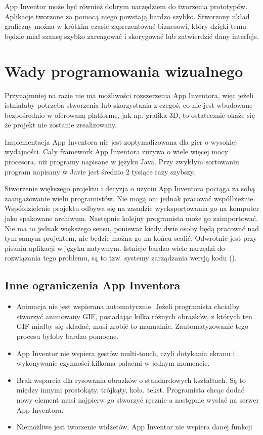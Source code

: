 App Inventor może być również dobrym narzędziem do tworzenia prototypów. Aplikacje tworzone za pomocą niego powstają bardzo szybko. Stworzony układ graficzny można w krótkim czasie zaprezentować biznesowi, który dzięki temu będzie miał szansę szybko zareagować i skorygować lub zatwierdzić dany interfejs.

\section{Wady programowania wizualnego}

Przynajmniej na razie nie ma możliwości rozszerzenia App Inventora, więc jeżeli istniałaby potrzeba stworzenia lub skorzystania z czegoś, co nie jest wbudowane bezpośrednio w oferowaną platformę, jak np. grafika 3D, to ostatecznie okaże się że projekt nie zostanie zrealizowany.

Implementacja App Inventora nie jest zoptymalizowana dla gier o wysokiej wydajności. Cały framework App Inventora zużywa o wiele więcej mocy procesora, niż programy napisane w języku Java. Przy zwykłym sortowaniu program napisany w Javie jest średnio 2 tysiące razy szybszy.

Stworzenie większego projektu i decyzja o użyciu App Inventora pociąga za sobą zaangażowanie wielu programistów. Nie mogą oni jednak pracować współbieżnie. Współdzielenie projektu odbywa się na zasadzie wyeksportowania go na komputer jako spakowane archiwum. Następnie kolejny programista może go zaimportować. Nie ma to jednak większego sensu, ponieważ kiedy dwie osoby będą pracować nad tym samym projektem, nie będzie można go na końcu scalić. Odwrotnie jest przy pisaniu aplikacji w języku natywnym. Istnieje bardzo wiele narzędzi do rozwiązania tego problemu, są to tzw. systemy zarządzania wersją kodu ().

\subsection{Inne ograniczenia App Inventora}

\begin{itemize}
\item Animacja nie jest wspierana automatycznie. Jeżeli programista chciałby stworzyć animowany GIF, posiadając kilka różnych obrazków, z których ten GIF miałby się składać, musi zrobić to manualnie. Zautomatyzowanie tego procesu byłoby bardzo pomocne.\cite{android:57}
\item App Inventor nie wspiera gestów multi-touch, czyli dotykania ekranu i wykonywanie czynności kilkoma palacmi w jednym momencie.\cite{android:57}
\item Brak wsparcia dla rysowania obrazków o standardowych kształtach. Są to między innymi prostokąty, trójkąty, koła, tekst. Programista chcąc dodać nowy element musi najpierw go stworzyć ręcznie a następnie wysłać na serwer App Inventora.\cite{android:57}
\item Niemożliwe jest tworzenie widżetów. App Inventor nie wspiera danej funkcji
\end{itemize}


